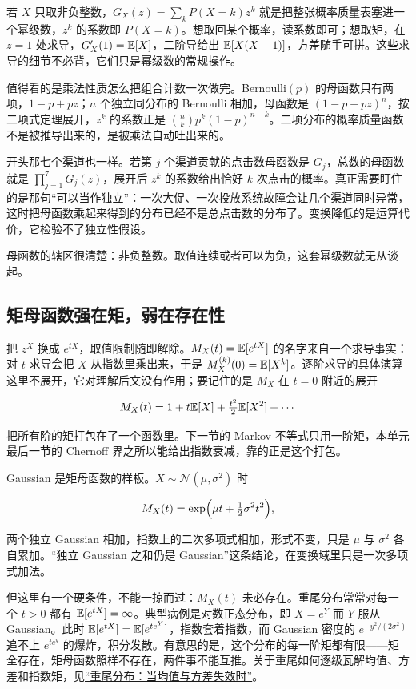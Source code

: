 若 \(X\) 只取非负整数，\(G_X(z)=\sum_k P(X=k)z^k\) 就是把整张概率质量表塞进一个幂级数，\(z^k\) 的系数即 \(P(X=k)\)。想取回某个概率，读系数即可；想取矩，在 \(z=1\) 处求导，\(G_X'(1)=\mathbb{E}[X]\)，二阶导给出 \(\mathbb{E}[X(X-1)]\)，方差随手可拼。这些求导的细节不必背，它们只是幂级数的常规操作。

值得看的是乘法性质怎么把组合计数一次做完。Bernoulli\((p)\) 的母函数只有两项，\(1-p+pz\)；\(n\) 个独立同分布的 Bernoulli 相加，母函数是 \((1-p+pz)^n\)，按二项式定理展开，\(z^k\) 的系数正是 \(\binom nk p^k(1-p)^{n-k}\)。二项分布的概率质量函数不是被推导出来的，是被乘法自动吐出来的。

开头那七个渠道也一样。若第 \(j\) 个渠道贡献的点击数母函数是 \(G_j\)，总数的母函数就是 \(\prod_{j=1}^{7}G_j(z)\)，展开后 \(z^k\) 的系数给出恰好 \(k\) 次点击的概率。真正需要盯住的是那句``可以当作独立''：一次大促、一次投放系统故障会让几个渠道同时异常，这时把母函数乘起来得到的分布已经不是总点击数的分布了。变换降低的是运算代价，它检验不了独立性假设。

母函数的辖区很清楚：非负整数。取值连续或者可以为负，这套幂级数就无从谈起。

\subsection{矩母函数强在矩，弱在存在性}

把 \(z^X\) 换成 \(e^{tX}\)，取值限制随即解除。\(M_X(t)=\mathbb{E}[e^{tX}]\) 的名字来自一个求导事实：对 \(t\) 求导会把 \(X\) 从指数里乘出来，于是 \(M_X^{(k)}(0)=\mathbb{E}[X^k]\)。逐阶求导的具体演算这里不展开，它对理解后文没有作用；要记住的是 \(M_X\) 在 \(t=0\) 附近的展开

\[
M_X(t)=1+t\mathbb{E}[X]+\tfrac{t^2}{2}\mathbb{E}[X^2]+\cdots
\]

把所有阶的矩打包在了一个函数里。下一节的 Markov 不等式只用一阶矩，本单元最后一节的 Chernoff 界之所以能给出指数衰减，靠的正是这个打包。

Gaussian 是矩母函数的样板。\(X\sim\mathcal N(\mu,\sigma^2)\) 时

\[
M_X(t)=\exp\Bigl(\mu t+\tfrac12\sigma^2t^2\Bigr),
\]

两个独立 Gaussian 相加，指数上的二次多项式相加，形式不变，只是 \(\mu\) 与 \(\sigma^2\) 各自累加。``独立 Gaussian 之和仍是 Gaussian''这条结论，在变换域里只是一次多项式加法。

但这里有一个硬条件，不能一掠而过：\(M_X(t)\) 未必存在。重尾分布常常对每一个 \(t>0\) 都有 \(\mathbb{E}[e^{tX}]=\infty\)。典型病例是对数正态分布，即 \(X=e^Y\) 而 \(Y\) 服从 Gaussian。此时 \(\mathbb{E}[e^{tX}]=\mathbb{E}[e^{te^Y}]\)，指数套着指数，而 Gaussian 密度的 \(e^{-y^2/(2\sigma^2)}\) 追不上 \(e^{te^y}\) 的爆炸，积分发散。有意思的是，这个分布的每一阶矩都有限——矩全存在，矩母函数照样不存在，两件事不能互推。关于重尾如何逐级瓦解均值、方差和指数矩，见\hyperref[sec:05-Probability/06-Common-Distributions/07]{``重尾分布：当均值与方差失效时''}。

